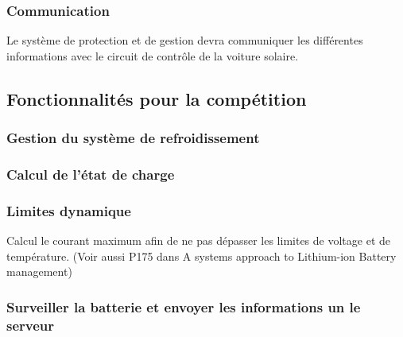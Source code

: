 		\subsubsection{Communication}
		Le système de protection et de gestion devra communiquer les différentes informations avec le circuit de contrôle de la voiture solaire. 
	
	\subsection{Fonctionnalités pour la compétition}
		\subsubsection{Gestion du système de refroidissement}
		
		
		\subsubsection{Calcul de l'état de charge}
		
		
		\subsubsection{Limites dynamique}
		Calcul le courant maximum afin de ne pas dépasser les limites de voltage et de température. (Voir aussi P175 dans A systems approach to Lithium-ion Battery management)
		
		\subsubsection{Surveiller la batterie et envoyer les informations un le serveur}
		
		
		